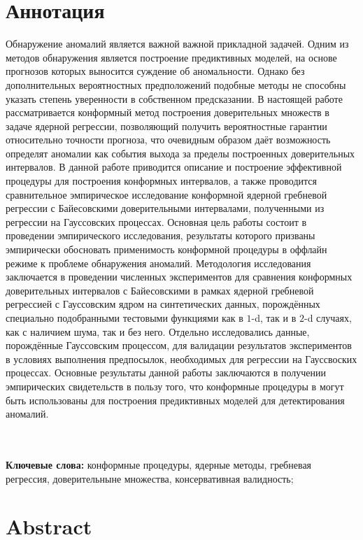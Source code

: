 \documentclass[a4paper,14pt]{extarticle}
\begin{document}
\clearpage
{}
\section*{Аннотация}

Обнаружение аномалий является важной важной прикладной задачей. Одним из методов
обнаружения является построение предиктивных моделей, на основе прогнозов которых
выносится суждение об аномальности. Однако без дополнительных вероятностных предположений
подобные методы не способны указать степень уверенности в собственном предсказании.
В настоящей работе рассматривается конформный метод построения доверительных множеств
в задаче ядерной регрессии, позволяющий получить вероятностные гарантии относительно
точности прогноза, что очевидным образом даёт возможность определят аномалии как
события выхода за пределы построенных доверительных интервалов. В данной работе
приводится описание и построение эффективной процедуры для построения конформных
интервалов, а также проводится сравнительное эмпирическое исследование конформной
ядерной гребневой регрессии с Байесовскими доверительными интервалами, полученными
из регрессии на Гауссовских процессах.
Основная цель работы состоит в проведении эмпирического исследования, результаты
которого призваны эмпирически обосновать применимость конформной процедуры в оффлайн
режиме к проблеме обнаружения аномалий. Методология исследования заключается в проведении
численных экспериментов для сравнения конформных доверительных интервалов с Байесовскими
в рамках ядерной гребневой регрессией с Гауссовским ядром на синтетических данных,
порождённых специально подобранными тестовыми функциями как в $1$-d, так и в $2$-d
случаях, как с наличием шума, так и без него. Отдельно исследовались данные, порождённые
Гауссовским процессом, для валидации результатов экспериментов в условиях выполнения
предпосылок, необходимых для регрессии на Гауссвоских процессах.
Основные результаты данной работы заключаются в получении эмпирических свидетельств
в пользу того, что конформные процедуры в могут быть использованы для построения
предиктивных моделей для детектирования аномалий.

\hfill\\\hfill\\
\noindent\textbf{Ключевые слова:} конформные процедуры, ядерные методы, гребневая регрессия,
доверительныне множества, консервативная валидность;

\clearpage
{}
\section*{Abstract}
\end{document}
